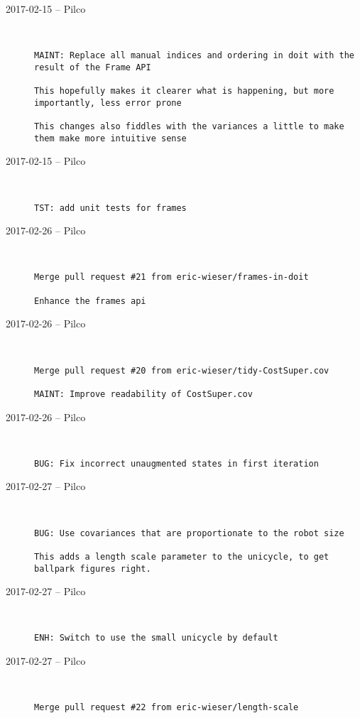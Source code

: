 \begin{description}
  \item[2017-02-15 -- Pilco] \hfill \
\begin{lstlisting}
MAINT: Replace all manual indices and ordering in doit with the result of the Frame API

This hopefully makes it clearer what is happening, but more importantly, less error prone

This changes also fiddles with the variances a little to make them make more intuitive sense
\end{lstlisting}


  \item[2017-02-15 -- Pilco] \hfill \
\begin{lstlisting}
TST: add unit tests for frames
\end{lstlisting}


  \item[2017-02-26 -- Pilco] \hfill \
\begin{lstlisting}
Merge pull request #21 from eric-wieser/frames-in-doit

Enhance the frames api\end{lstlisting}


  \item[2017-02-26 -- Pilco] \hfill \
\begin{lstlisting}
Merge pull request #20 from eric-wieser/tidy-CostSuper.cov

MAINT: Improve readability of CostSuper.cov\end{lstlisting}


  \item[2017-02-26 -- Pilco] \hfill \
\begin{lstlisting}
BUG: Fix incorrect unaugmented states in first iteration
\end{lstlisting}


  \item[2017-02-27 -- Pilco] \hfill \
\begin{lstlisting}
BUG: Use covariances that are proportionate to the robot size

This adds a length scale parameter to the unicycle, to get ballpark figures right.
\end{lstlisting}


  \item[2017-02-27 -- Pilco] \hfill \
\begin{lstlisting}
ENH: Switch to use the small unicycle by default
\end{lstlisting}


  \item[2017-02-27 -- Pilco] \hfill \
\begin{lstlisting}
Merge pull request #22 from eric-wieser/length-scale


\end{lstlisting}
\end{description}
